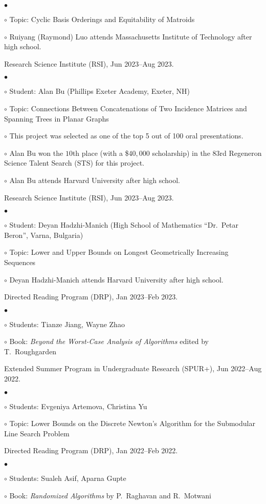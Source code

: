 \documentclass[margin,line]{res}
\newenvironment{list2}{
  \begin{list}{$\bullet$}{%
      \setlength{\itemsep}{0in}
      \setlength{\parsep}{0in} \setlength{\parskip}{0in}
      \setlength{\topsep}{0in} \setlength{\partopsep}{0in}
      \setlength{\leftmargin}{0.2in}}}{\end{list}}
\newenvironment{list3}{
  \begin{list}{\ding{113}}{%
      \setlength{\itemsep}{0.05in}
      \setlength{\parsep}{0.025in} \setlength{\parskip}{0in}
      \setlength{\topsep}{0in} \setlength{\partopsep}{0in}
      \setlength{\leftmargin}{0.17in}}}{\end{list}}
\begin{document}
\begin{resume}
\begin{list3}
\begin{list2}
  \item[$\circ$] Topic: Cyclic Basis Orderings and Equitability of Matroids
  \item[$\circ$] Ruiyang (Raymond) Luo attends Massachusetts Institute of Technology after high school.
  \end{list2}
\item[] Research Science Institute (RSI), Jun 2023--Aug 2023.
  \begin{list2}
  \item[$\circ$] Student: Alan Bu (Phillips Exeter Academy, Exeter, NH)
  \item[$\circ$] Topic: Connections Between Concatenations of Two Incidence Matrices and Spanning Trees in Planar Graphs
  \item[$\circ$] This project was selected as one of the top 5 out of 100 oral presentations.
  \item[$\circ$] Alan Bu won the $10$th place (with a \$$40,000$ scholarship) in the $83$rd Regeneron Science Talent Search (STS) for this project.
  \item[$\circ$] Alan Bu attends Harvard University after high school.
  \end{list2}
\item[] Research Science Institute (RSI), Jun 2023--Aug 2023.
  \begin{list2}
  \item[$\circ$] Student: Deyan Hadzhi-Manich (High School of Mathematics ``Dr.\ Petar Beron'', Varna, Bulgaria)
  \item[$\circ$] Topic: Lower and Upper Bounds on Longest Geometrically Increasing Sequences
  \item[$\circ$] Deyan Hadzhi-Manich attends Harvard University after high school.
  \end{list2}
\item[] Directed Reading Program (DRP), Jan 2023--Feb 2023.
  \begin{list2}
  \item[$\circ$] Students: Tianze Jiang, Wayne Zhao
  \item[$\circ$] Book: \emph{Beyond the Worst-Case Analysis of Algorithms} edited by T.\ Roughgarden
  \end{list2}
\item[] Extended Summer Program in Undergraduate Research (SPUR+), Jun 2022--Aug 2022.
  \begin{list2}
  \item[$\circ$] Students: Evgeniya Artemova, Christina Yu
  \item[$\circ$] Topic: Lower Bounds on the Discrete Newton's Algorithm for the Submodular Line Search Problem
  \end{list2}
\item[] Directed Reading Program (DRP), Jan 2022--Feb 2022.
  \begin{list2}
  \item[$\circ$] Students: Sualeh Asif, Aparna Gupte
  \item[$\circ$] Book: \emph{Randomized Algorithms} by P.\ Raghavan and R.\ Motwani
  \end{list2}
\end{list3}


\end{resume}
\end{document}
